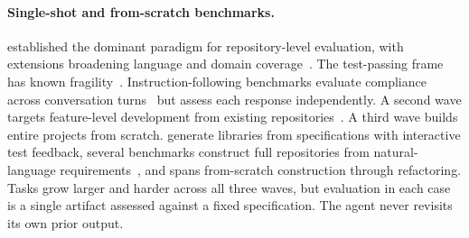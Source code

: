 \paragraph{Single-shot and from-scratch benchmarks.} \citet{swe-bench} established the dominant paradigm for repository-level evaluation, with extensions broadening language and domain coverage~\citep{swe-bench-plus, multi-swe-bench, rust-swe-bench, swe-rebench-v2, swe-polybench}. The test-passing frame has known fragility~\citep{swe-abs, lessleak-bench}. Instruction-following benchmarks evaluate compliance across conversation turns~\citep{codeif-bench, multicodeif} but assess each response independently. A second wave targets feature-level development from existing repositories~\citep{fea-bench, featurebench}. A third wave builds entire projects from scratch. \citet{commit0} generate libraries from specifications with interactive test feedback, several benchmarks construct full repositories from natural-language requirements~\citep{projdevbench, e2edevbench, nl2repo-bench, swe-agi, projecteval}, and \citet{longcli-bench} spans from-scratch construction through refactoring. Tasks grow larger and harder across all three waves, but evaluation in each case is a single artifact assessed against a fixed specification. The agent never revisits its own prior output.

